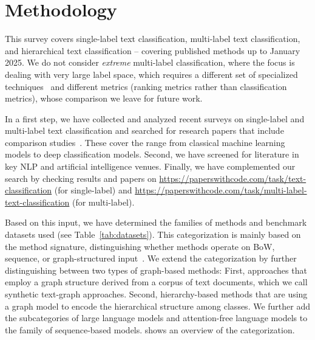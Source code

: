 \section{Methodology}\label{sec:sota}

This survey covers single-label text classification, multi-label text classification, and hierarchical text classification -- covering published methods up to January 2025.
We do not consider \emph{extreme} multi-label classification, where the focus is dealing with very large label space, which requires a different set of specialized techniques~\cite{xml0,xml4,xml3,xml2} and different metrics (ranking metrics rather than classification metrics), whose comparison we leave for future work. 

In a first step, we have collected and analyzed recent surveys on single-label and multi-label text classification and searched for research papers that include comparison studies~\cite{
wang2023graph,
duarte2023review,
buguenoConnectingDotsWhat2023,
DBLP:journals/tist/LiPLXYSYH22,
DBLP:journals/csur/MinaeeKCNCG21,
DBLP:journals/pr/TarekegnGM21,
DBLP:journals/corr/abs-2107-03158,
raihan2021-survey,
DBLP:journals/wias/ZhouGLVTBBK20,
DBLP:conf/esann/QaraeiKB20,
DBLP:journals/corr/abs-2011-11197,
DBLP:journals/information/KowsariMHMBB19,
DBLP:journals/air/Kadhim19,
galkescherp-acl2022,
DBLP:conf/jcdl/MaiGS18,
DBLP:conf/kcap/GalkeMSBS17,
DBLP:conf/sigir/ZhangWYWZ16}.
These cover the range from classical machine learning models to deep classification models.
Second, we have screened for literature in key NLP and artificial intelligence venues.
Finally, we have complemented our search by checking results and papers on \url{https://paperswithcode.com/task/text-classification} (for single-label) and \url{https://paperswithcode.com/task/multi-label-text-classification} (for multi-label).

Based on this input, we have determined the families of methods and benchmark datasets used (see Table~\ref{tab:datasets}).
This categorization is mainly based on the method signature, distinguishing whether methods operate on BoW, sequence, or graph-structured input~\cite{galkescherp-acl2022}. 
We extend the categorization by further distinguishing between two types of graph-based methods: 
First, approaches that employ a graph structure derived from a corpus of text documents, which we call synthetic text-graph approaches. 
Second, hierarchy-based methods that are using a graph model to encode the hierarchical structure among classes. 
We further add the subcategories of large language models and attention-free language models to the family of sequence-based models. 
 shows an overview of the categorization.

